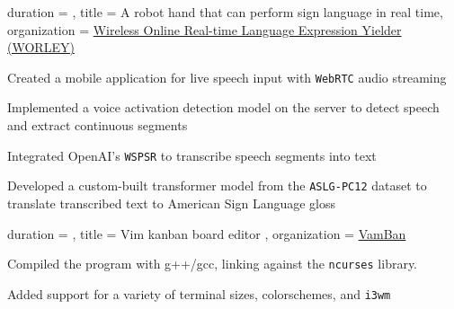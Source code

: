 \documentclass[sidebar-width=2.25in, primary=slate]{clean-resume}
\begin{document}

    \begin{experience}
      {
        duration = {  },
        title = {A robot hand that can perform sign language in real time},
        organization = {\href{https://github.com/Yubo-Cao/worley}{Wireless Online Real-time Language Expression Yielder (WORLEY)\phantom{aaaaaaaaaaaa}}}
      }
      \item Created a mobile application for live speech input with \verb|WebRTC| audio streaming
      \item Implemented a voice activation detection model on the server to detect speech and extract continuous segments
      \item Integrated OpenAI's \verb|WSPSR| to transcribe speech segments into text
      \item Developed a custom-built transformer model from the \verb|ASLG-PC12| dataset to translate transcribed text to American Sign Language gloss
    \end{experience}

    \begin{experience}
      {
        duration = {  },
        title = { Vim kanban board editor },
        organization = { \href{https://github.com/anishgoyal1108/VamBan}{VamBan} }
      }
      \item Compiled the program with g++/gcc, linking against the \verb|ncurses| library.
      \item Added support for a variety of terminal sizes, colorschemes, and \verb|i3wm|
    \end{experience}
\end{document}
